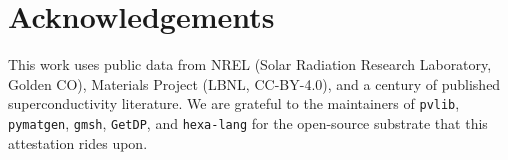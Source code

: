 \documentclass[11pt,a4paper]{article}
\begin{document}
\section*{Acknowledgements}

This work uses public data from NREL (Solar Radiation Research
Laboratory, Golden CO), Materials Project (LBNL, CC-BY-4.0), and a
century of published superconductivity literature. We are grateful
to the maintainers of \texttt{pvlib}, \texttt{pymatgen}, \texttt{gmsh},
\texttt{GetDP}, and \texttt{hexa-lang} for the open-source substrate
that this attestation rides upon.



\end{document}
